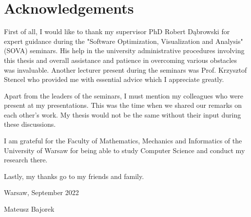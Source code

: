 \chapter*{Acknowledgements}

First of all, I would like to thank my supervisor PhD Robert Dąbrowski for expert guidance during the "Software Optimization, Visualization and Analysis" (SOVA) seminars. His help in the university administrative procedures involving this thesis and overall assistance and patience in overcoming various obstacles was invaluable. Another lecturer present during the seminars was Prof. Krzysztof Stencel who provided me with essential advice which I appreciate greatly.

Apart from the leaders of the seminars, I must mention my colleagues who were present at my presentations. This was the time when we shared our remarks on each other's work. My thesis would not be the same without their input during these discussions.

I am grateful for the Faculty of Mathematics, Mechanics and Informatics of the University of Warsaw for being able to study Computer Science and conduct my research there.

Lastly, my thanks go to my friends and family.

\begin{flushright}
Warsaw, September 2022

Mateusz Bajorek
\end{flushright}
